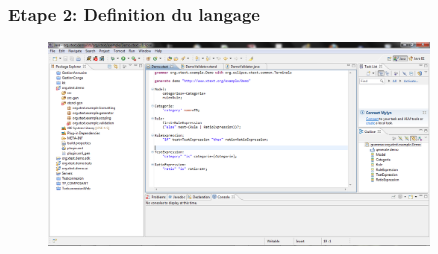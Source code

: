 \documentclass{beamer}
\begin{document}
	\begin{frame}
	\frametitle{Etape 2: Definition du langage}
	\begin{figure}[h]
	\centering
			\includegraphics[width=0.90\textwidth]{2.PNG}
	\label{fig:2}
\end{figure}

\end{frame} 
\end{document}
